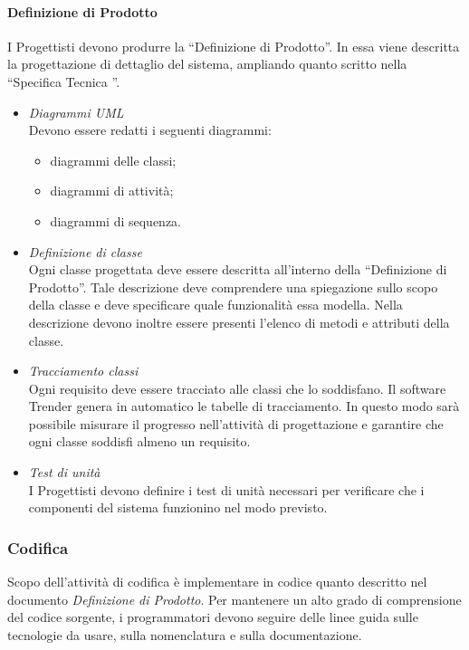 \paragraph{Definizione di Prodotto}
I Progettisti devono produrre la “Definizione di Prodotto”. In essa viene descritta la progettazione di dettaglio del sistema, ampliando quanto scritto nella “Specifica Tecnica \VersioneST ”.
\begin{itemize}
\item \emph{Diagrammi UML}\\
Devono essere redatti i seguenti diagrammi:
\begin{itemize}
\item diagrammi delle classi;
\item diagrammi di attività;
\item diagrammi di sequenza.
\end{itemize}

\item \emph{Definizione di classe}\\
Ogni classe progettata deve essere descritta all’interno della “Definizione di Prodotto”. Tale descrizione deve comprendere una spiegazione sullo scopo della classe e deve specificare quale funzionalità essa modella. Nella descrizione devono inoltre essere presenti l’elenco di metodi e attributi della classe.
\item \emph{Tracciamento classi}\\
Ogni requisito deve essere tracciato alle classi che lo soddisfano. Il software
Trender genera in automatico le tabelle di tracciamento. In questo modo sarà possibile misurare il progresso nell’attività di progettazione e garantire che ogni classe soddisfi almeno un requisito.
\item \emph{Test di unità}\\
I Progettisti devono definire i test di unità necessari per verificare che i componenti del sistema funzionino nel modo previsto.
\end{itemize}


\subsubsection{Codifica}
Scopo dell’attività di codifica è implementare in codice quanto descritto nel documento \textit{Definizione di Prodotto}. Per mantenere un alto grado di comprensione del codice sorgente, i programmatori devono seguire delle linee guida sulle tecnologie da usare, sulla nomenclatura e sulla documentazione.

